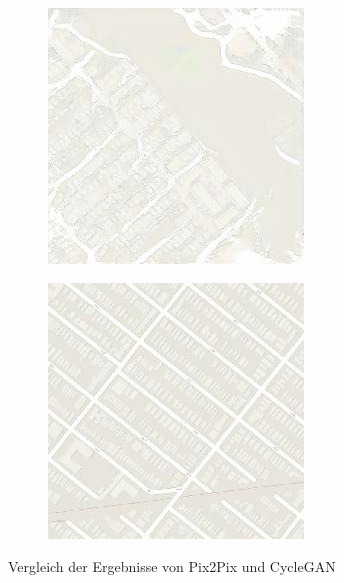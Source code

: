 \begin{figure}
\begin{subfigure}[t]{.2\textwidth}
	  \end{subfigure}
	  \begin{subfigure}[t]{.2\textwidth}
		\centering
		\includegraphics[width=\linewidth]{images/Vergleich/Maps17_t.jpg}
	  \end{subfigure}
	  \begin{subfigure}[t]{.2\textwidth}
		\centering
		\includegraphics[width=\linewidth]{images/Vergleich/Maps12.jpg}
	  \end{subfigure}
  
	\caption{Vergleich der Ergebnisse von Pix2Pix und CycleGAN}
  
  \end{figure}




